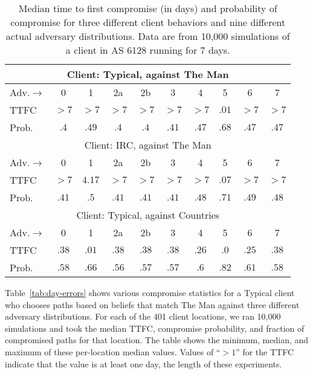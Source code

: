 \documentclass[conference]{styles/IEEEtran}
\begin{document}
\begin{table}
\begin{center}
\begin{tabular}{|l|c|c|c|c|c|c|c|c|c|}\hline
\multicolumn{10}{|c|}{Client: Typical, against \textsf{The Man}}\\ \hline
Adv.$\rightarrow$ & 0 & 1 & 2a & 2b & 3 & 4 & 5 & 6 & 7 \\ \hline
TTFC & $>7$ & $>7$ & $>7$ & $>7$ & $>7$ & $>7$ & $.01$ & $>7$ &  $>7$  \\ \hline
Prob. & $.4$ & $.49$ & $.4$ & $.4$ & $.41$ & $.47$ & $.68$ & $.47$ &  $.47$  \\ \hline\hline
\multicolumn{10}{|c|}{Client: IRC, against \textsf{The Man}}\\ \hline
Adv.$\rightarrow$ & 0 & 1 & 2a & 2b & 3 & 4 & 5 & 6 & 7 \\ \hline
TTFC & $>7$ & $4.17$ & $>7$ & $>7$ & $>7$ & $>7$ & $.07$ & $>7$ & $>7$  \\ \hline
Prob. & $.41$ & $.5$ & $.41$ & $.41$ & $.41$ & $.48$ & $.71$ & $.49$ &  $.48$  \\ \hline\hline
\multicolumn{10}{|c|}{Client: Typical, against \textsf{Countries}}\\ \hline
Adv.$\rightarrow$ & 0 & 1 & 2a & 2b & 3 & 4 & 5 & 6 & 7 \\ \hline
TTFC & $.38$ & $.01$ & $.38$ & $.38$ & $.38$ & $.26$ & $.0$ & $.25$ &  $.38$  \\ \hline
Prob. & $.58$ & $.66$ & $.56$ & $.57$ & $.57$ & $.6$ & $.82$ & $.61$ &  $.58$  \\ 
\hline \end{tabular}
\end{center}
\vspace{-2mm}
\caption{\small Median time to first compromise (in days) and probability of compromise for three different client behaviors and nine different actual adversary distributions.  Data are from 10,000 simulations of a client in AS 6128 running for 7 days.}\label{tab:weeklong-errors}
\vspace{-4mm}
\end{table}

Table~\ref{tab:day-errors} shows various compromise statistics for a Typical client who chooses paths based on beliefs that match \textsf{The Man} against three different adversary distributions.  For each of the 401 client locations, we ran 10,000 simulations and took the median TTFC, compromise probability, and fraction of compromised paths for that location.  The table shows the minimum, median, and maximum of these per-location median values.  Values of ``$>1$'' for the TTFC indicate that the value is at least one day, the length of these experiments.
\end{document}
